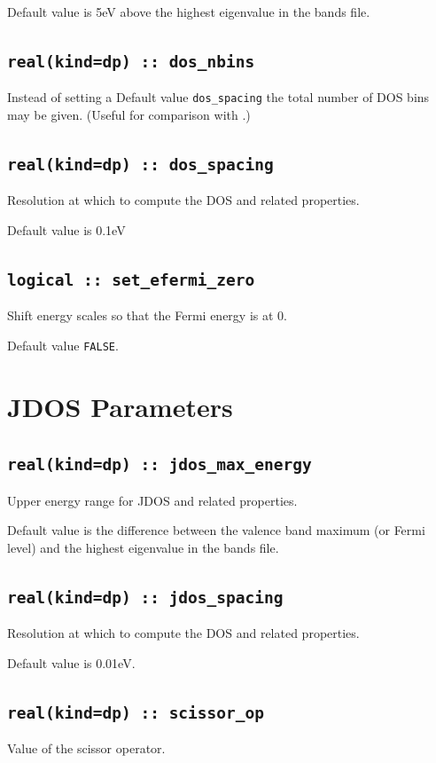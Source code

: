 \documentclass[a4paper,11pt,twoside]{book}
\begin{document}
{Default value is 5eV above the highest eigenvalue in the bands file.


\subsection[dos\_nbins]{\tt real(kind=dp) :: dos\_nbins}
Instead of setting a Default value \verb#dos_spacing# the total number of DOS bins may be given.  (Useful for comparison with \lindos.)

\subsection[dos\_spacing]{\tt real(kind=dp) :: dos\_spacing}
Resolution at which to compute the DOS and related properties.

Default value is 0.1eV

\subsection[set\_efermi\_zero]{\tt logical :: set\_efermi\_zero}
Shift energy scales so that the Fermi energy is at 0.

Default value \verb#FALSE#.



\section{JDOS Parameters}

\subsection[jdos\_max\_energy]{\tt real(kind=dp) :: jdos\_max\_energy}
Upper energy range for JDOS and related properties.

Default value is the difference between the valence band maximum (or
Fermi level) and the highest eigenvalue in the bands file.

\subsection[jdos\_spacing]{\tt real(kind=dp) :: jdos\_spacing}
Resolution at which to compute the DOS and related properties.

Default value is 0.01eV.

\subsection[scissor\_op]{\tt real(kind=dp) :: scissor\_op}
Value of the scissor operator.

}
\end{document}
